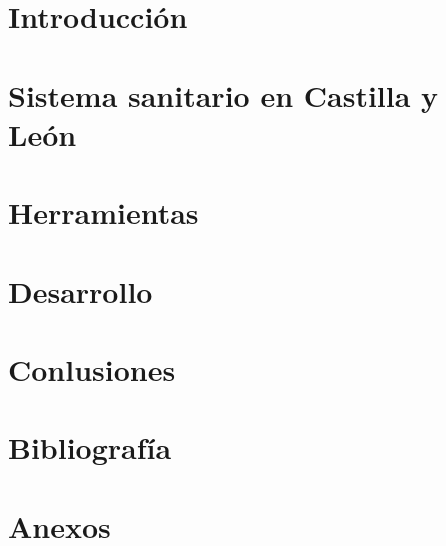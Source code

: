 \documentclass[12pt, a4paper]{report}
\begin{document}
\tableofcontents

\chapter{Introducción}




\chapter{Sistema sanitario en Castilla y León}


\chapter{Herramientas}
\chapter{Desarrollo}
\chapter{Conlusiones}
\chapter*{Bibliografía}

\appendix
\chapter{Anexos}

\printbibliography
\end{document}
